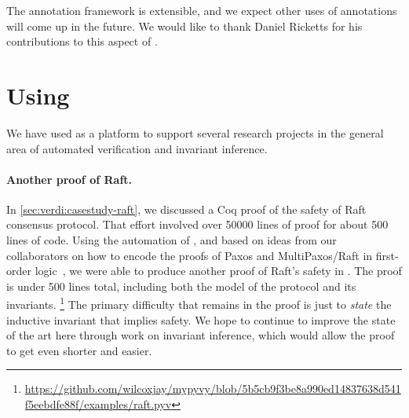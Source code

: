 The annotation framework is extensible, and we expect other uses of annotations will come up in the future.
We would like to thank Daniel Ricketts for his contributions to this aspect of \mypyvy.

%

\section{Using \mypyvy}

We have used \mypyvy as a platform to support several research projects
  in the general area of automated verification and invariant inference.

\paragraph{Another proof of Raft.}
In \cref{sec:verdi:casestudy-raft}, we discussed a Coq proof of
  the safety of Raft consensus protocol.
That effort involved over 50000 lines of proof for about 500 lines of code.
Using the automation of \mypyvy,
  and based on ideas from our collaborators on
  how to encode the proofs of Paxos and MultiPaxos/Raft in first-order logic~\cite{Padon-al:OOPSLA17, pldi18-mfd},
  we were able to produce another proof of Raft's safety in \mypyvy.
The \mypyvy proof is under 500 lines total,
  including both the model of the protocol and its invariants.%
\footnote{\url{https://github.com/wilcoxjay/mypyvy/blob/5b5cb9f3be8a990ed14837638d541f5eebdfe88f/examples/raft.pyv}}
The primary difficulty that remains in the proof is
  just to \emph{state} the inductive invariant that implies safety.
We hope to continue to improve the state of the art here
  through work on invariant inference,
  which would allow the proof to get even shorter and easier.

